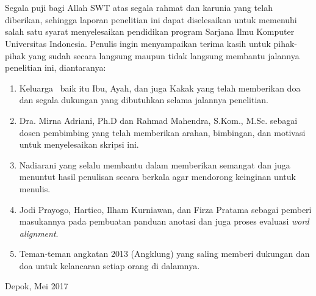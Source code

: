 \chapter*{\kataPengantar}

Segala puji bagi Allah SWT atas segala rahmat dan karunia yang telah diberikan, sehingga laporan penelitian ini dapat diselesaikan untuk memenuhi salah satu syarat menyelesaikan pendidikan program Sarjana Ilmu Komputer Universitas Indonesia. Penulis ingin menyampaikan terima kasih untuk pihak-pihak yang sudah secara langsung maupun tidak langsung membantu jalannya penelitian ini, diantaranya:

\begin{enumerate}
	\item Keluarga \saya~baik itu Ibu, Ayah, dan juga Kakak yang telah memberikan doa dan segala dukungan yang dibutuhkan selama jalannya penelitian.
	\item Dra. Mirna Adriani, Ph.D dan Rahmad Mahendra, S.Kom., M.Sc. sebagai dosen pembimbing yang telah memberikan arahan, bimbingan, dan motivasi untuk menyelesaikan skripsi ini.
	\item Nadiarani yang selalu membantu dalam memberikan semangat dan juga menuntut hasil penulisan secara berkala agar mendorong keinginan untuk menulis.
	\item Jodi Prayogo, Hartico, Ilham Kurniawan, dan Firza Pratama sebagai pemberi masukannya pada pembuatan panduan anotasi dan juga proses evaluasi \textit{word alignment}.
	\item Teman-teman angkatan 2013 (Angklung) yang saling memberi dukungan dan doa untuk kelancaran setiap orang di dalamnya.
	
	
\end{enumerate}
\vspace*{0.1cm}
\begin{flushright}
	Depok, Mei 2017\\[0.1cm]
	\vspace*{1cm}
	\penulis
	
\end{flushright}